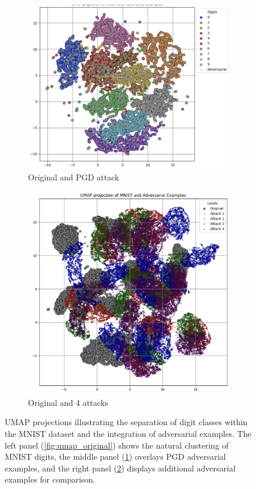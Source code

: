 \documentclass[10pt, conference, a4paper, final]{IEEEtran}
\begin{document}
\begin{figure}[!ht]
\begin{subfigure}{.34\textwidth}
        \includegraphics[width=\linewidth]{paper_images/UMAP_adv.png}
        \caption{Original and PGD attack}
        \label{fig:umap_pgd}
    \end{subfigure}%
    \hfill
    \begin{subfigure}{.28\textwidth}
        \centering
        \includegraphics[width=\linewidth]{paper_images/UMAP_adversary.png}
        \caption{Original and 4 attacks}
        \label{fig:umap_additional_adv}
    \end{subfigure}
    \caption{UMAP projections illustrating the separation of digit classes within the MNIST dataset and the integration of adversarial examples.
     The left panel (\ref{fig:umap_original}) shows the natural clustering of MNIST digits, the middle panel (\ref{fig:umap_pgd}) overlays PGD 
     adversarial examples, and the right panel (\ref{fig:umap_additional_adv}) displays additional adversarial examples for comparison.}
    \label{fig:umap}
\end{figure}
\end{document}

